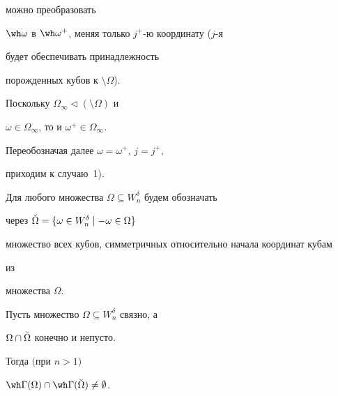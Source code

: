 \begin{pf}
можно преобразовать 


$\wh\omega$ в $\wh\omega^+$, меняя только $j^+$-ю координату ($j$-я 


будет обеспечивать принадлежность 


порожденных кубов к $\setminus\Omega$). 


Поскольку $\Omega_\infty\vartriangleleft(\setminus\Omega)$ и 


$\omega\in\Omega_\infty$, то и $\omega^+\in\Omega_\infty$. 


Переобозначая далее $\omega=\omega^+$, $j=j^+$, 


приходим к случаю~1). 


\end{pf} 


 


Для любого множества $\Omega\subseteq W^\delta_n$ будем обозначать 


через $\Breve\Omega=\{\omega\in W^\delta_n\mid-\omega\in\Omega\}$ 


множество всех кубов, симметричных относительно начала координат кубам 


из 


множества $\Omega$. 


 


\begin{thm} 


Пусть множество $\Omega\subseteq W^\delta_n$ связно, а 


$\Omega\cap\Breve\Omega$ конечно и непусто. 


Тогда $($при $n>1)$ 


$\wh\Gamma(\Omega)\cap\wh\Gamma(\Breve\Omega)\ne\emptyset$. 


\end{thm} 


 


